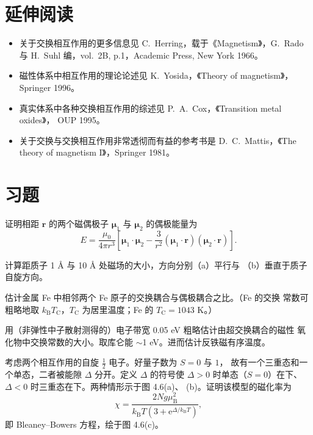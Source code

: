\section*{延伸阅读}

\begin{itemize}[itemsep=0.2em]
\item 关于交换相互作用的更多信息见 C.~Herring，载于《Magnetism》，G.~Rado 与
H.~Suhl 编，vol.~2B, p.1，Academic Press, New York 1966。
\item 磁性体系中相互作用的理论论述见 K.~Yosida，《Theory of magnetism》，
Springer 1996。
\item 真实体系中各种交换相互作用的综述见 P.~A.~Cox，《Transition metal oxides》，
OUP 1995。
\item 关于交换与交换相互作用非常透彻而有益的参考书是 D.~C.~Mattis，《The theory
of magnetism I》，Springer 1981。
\end{itemize}

\section*{习题}

 证明相距 $\mathbf{r}$ 的两个磁偶极子 $\boldsymbol{\mu}_1$ 与
$\boldsymbol{\mu}_2$ 的偶极能量为
\begin{equation*}
E = \frac{\mu_0}{4\pi r^{3}}\left[\boldsymbol{\mu}_1\cdot\boldsymbol{\mu}_2 - \frac{3}{r^{2}}(\boldsymbol{\mu}_1\cdot\mathbf{r})(\boldsymbol{\mu}_2\cdot\mathbf{r})\right].\tag{4.22}
\end{equation*}

 计算距质子 1 \AA{} 与 10 \AA{} 处磁场的大小，方向分别（a）平行与
（b）垂直于质子自旋方向。

 估计金属 Fe 中相邻两个 Fe 原子的交换耦合与偶极耦合之比。（Fe 的交换
常数可粗略地取 $k_{\mathrm{B}}T_{\mathrm{C}}$，$T_{\mathrm{C}}$ 为居里温度；Fe 的
$T_{\mathrm{C}}=1043$ K。）

 用（非弹性中子散射测得的）电子带宽 0.05 eV 粗略估计由超交换耦合的磁性
氧化物中交换常数的大小。取库仑能 $\sim$1 eV。进而估计反铁磁有序温度。

 考虑两个相互作用的自旋 $\frac{1}{2}$ 电子。好量子数为 $S=0$ 与 $1$，
故有一个三重态和一个单态，二者被能隙 $\Delta$ 分开。定义 $\Delta$ 的符号使
$\Delta>0$ 时单态（$S=0$）在下、$\Delta<0$ 时三重态在下。两种情形示于图 4.6(a)、
(b)。证明该模型的磁化率为
\begin{equation*}
\chi = \frac{2Ng\mu_{\mathrm{B}}^{2}}{k_{\mathrm{B}}T(3+\mathrm{e}^{\Delta/k_{\mathrm{B}}T})},\tag{4.23}
\end{equation*}
即 Bleaney--Bowers 方程，绘于图 4.6(c)。

